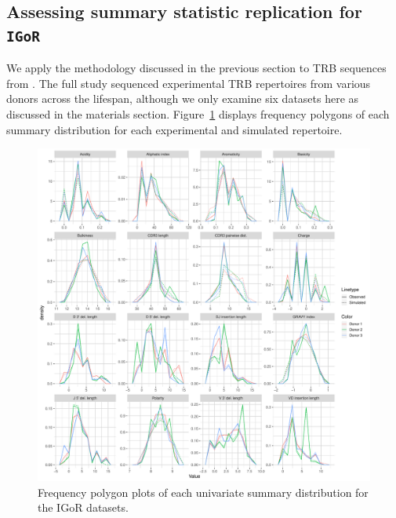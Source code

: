 \documentclass{article}
\newcommand{\igor}{\texttt{IGoR}}
\begin{document}
\subsection*{Assessing summary statistic replication for \igor}
We apply the methodology discussed in the previous section to TRB sequences from \cite{Britanova2016-iw}.
The full study sequenced experimental TRB repertoires from various donors across the lifespan, although we only examine six datasets here as discussed in the materials section.
Figure~\ref{fig:IgorFreqPolys} displays frequency polygons of each summary distribution for each experimental and simulated repertoire.
\begin{figure}
    \includegraphics[width=\linewidth]{Figures/IgorScores/igor_freqpoly.pdf}
    \caption{Frequency polygon plots of each univariate summary distribution for the IGoR datasets.}
    \label{fig:IgorFreqPolys}
\end{figure}
\end{document}
